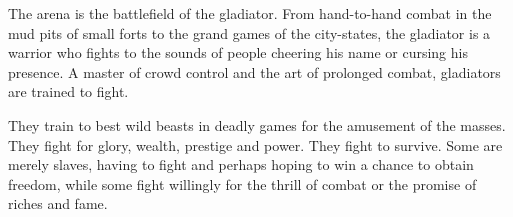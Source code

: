 The arena is the battlefield of the gladiator. From hand-to-hand combat in the mud pits of small forts to the grand games of the city-states, the gladiator is a warrior who fights to the sounds of people cheering his name or cursing his presence. A master of crowd control and the art of prolonged combat, gladiators are trained to fight.

They train to best wild beasts in deadly games for the amusement of the masses. They fight for glory, wealth, prestige and power. They fight to survive. Some are merely slaves, having to fight and perhaps hoping to win a chance to obtain freedom, while some fight willingly for the thrill of combat or the promise of riches and fame.


